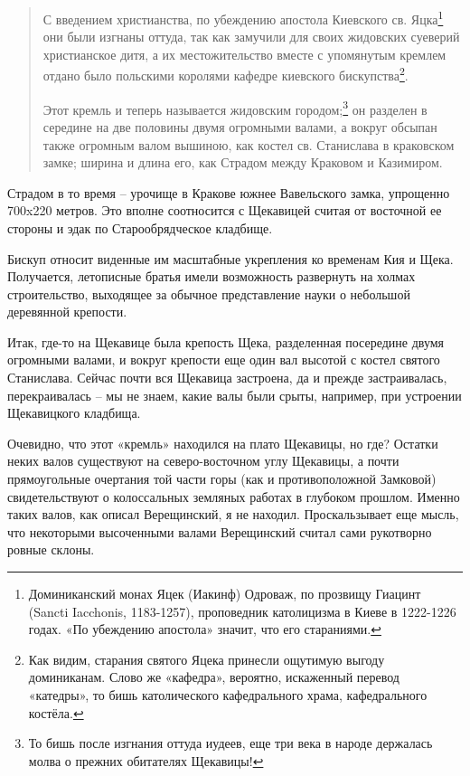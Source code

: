 \begin{quotation}
С введением христианства, по убеждению апостола Киевского св. Яцка\footnote{Доминиканский монах Яцек (Иакинф) Одроваж, по прозвищу Гиацинт (Sancti Iacchonis, 1183-1257), проповедник католицизма в Киеве в 1222-1226 годах. «По убеждению апостола» значит, что его стараниями.} они были изгнаны оттуда, так как замучили для своих жидовских суеверий христианское дитя, а их местожительство вместе с упомянутым кремлем отдано было польскими королями кафедре киевского бискупства\footnote{Как видим, старания святого Яцека принесли ощутимую выгоду доминиканам. Слово же «кафедра», вероятно, искаженный перевод «катедры», то бишь католического кафедрального храма, кафедрального костёла.}.

Этот кремль и теперь называется жидовским городом;\footnote{То бишь после изгнания оттуда иудеев, еще три века в народе держалась молва о прежних обитателях Щекавицы!} он разделен в середине на две половины двумя огромными валами, а вокруг обсыпан также огромным валом вышиною, как костел св. Станислава в краковском замке; ширина и длина его, как Страдом между Краковом и Казимиром.
\end{quotation}

Страдом в то время – урочище в Кракове южнее Вавельского замка, упрощенно 700x220 метров. Это вполне соотносится с Щекавицей считая от восточной ее стороны и эдак по Старообрядческое кладбище.

Бискуп относит виденные им масштабные укрепления ко временам Кия и Щека. Получается, летописные братья имели возможность развернуть на холмах строительство, выходящее за обычное представление науки о небольшой деревянной крепости.

Итак, где-то на Щекавице была крепость Щека, разделенная посередине двумя огромными валами, и вокруг крепости еще один вал высотой с костел святого Станислава. Сейчас почти вся Щекавица застроена, да и прежде застраивалась, перекраивалась – мы не знаем, какие валы были срыты, например, при устроении Щекавицкого кладбища.

Очевидно, что этот «кремль» находился на плато Щекавицы, но где? Остатки неких валов существуют на северо-восточном углу Щекавицы, а почти прямоугольные очертания той части горы (как и противоположной Замковой) свидетельствуют о колоссальных земляных работах в глубоком прошлом. Именно таких валов, как описал Верещинский, я не находил. Проскальзывает еще мысль, что некоторыми высоченными валами Верещинский считал сами рукотворно ровные склоны.

